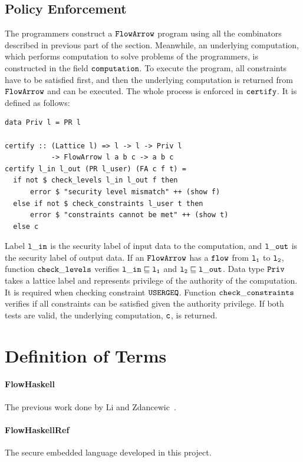 \documentclass{report}
\newcommand{\co}[1]{$\cod{#1}$}
\begin{document}
\subsection{Policy Enforcement}
The programmers construct a \co{FlowArrow} program using all the combinators 
described in previous part of the section. Meanwhile, an underlying computation, which performs computation
to solve problems of the programmers, is constructed in the field \co{computation}.  
To execute the program,
all constraints have to be satisfied first, and then the underlying computation
is returned from \co{FlowArrow} and can be executed.
The whole process is enforced in \co{certify}. It is defined as follows:
\begin{Verbatim}[fontsize=\small]
data Priv l = PR l

certify :: (Lattice l) => l -> l -> Priv l 
           -> FlowArrow l a b c -> a b c
certify l_in l_out (PR l_user) (FA c f t) =
  if not $ check_levels l_in l_out f then
      error $ "security level mismatch" ++ (show f)
  else if not $ check_constraints l_user t then
      error $ "constraints cannot be met" ++ (show t)
  else c
\end{Verbatim}
Label \co{l\_in} is the security label of input data to the computation,
and \co{l\_out} is the security label of output data. 
If an \co{FlowArrow} has a \co{flow} from \co{l_1} to \co{l_2}, function \co{check\_levels} 
verifies $\mathtt{l\_in} \sqsubseteq \mathtt{l_1}$ and $\mathtt{l_2} \sqsubseteq \mathtt{l\_out}$.
Data type \co{Priv} takes a lattice label and represents privilege of the authority of the
computation. It is required when checking constraint \co{USERGEQ}.
Function \co{check\_constraints} verifies if all constraints can be satisfied given the authority
privilege. If both tests are valid, the underlying computation, \co{c}, is returned.

\section{Definition of Terms}
\paragraph{FlowHaskell}
The previous work done by Li and Zdancewic~\cite{Li:Zdancewic:CSFW}.

\paragraph{FlowHaskellRef}
The secure embedded language developed in this project. 
\end{document}
